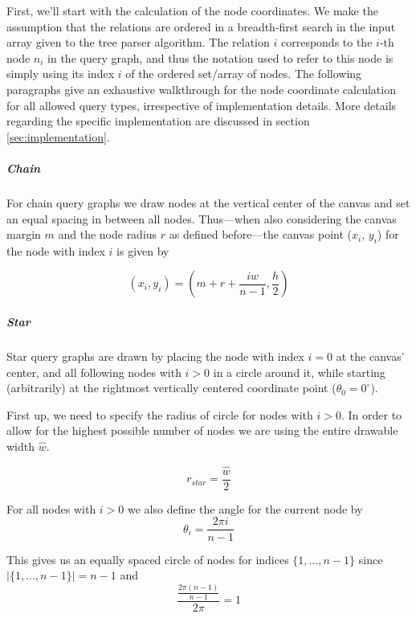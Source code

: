 First, we'll start with the calculation of the node coordinates. We make the assumption that the relations are ordered in a breadth-first search in the input array given to the tree parser algorithm. The relation $i$ corresponds to the $i$-th node $n_i$ in the query graph, and thus the notation used to refer to this node is simply using its index $i$ of the ordered set/array of nodes. The following paragraphs give an exhaustive walkthrough for the node coordinate calculation for all allowed query types, irrespective of implementation details. More details regarding the specific implementation are discussed in section \ref{sec:implementation}.

\subparagraph{Chain} 
For chain query graphs we draw nodes at the vertical center of the canvas and set an equal spacing in between all nodes. Thus—when also considering the canvas margin $m$ and the node radius $r$ as defined before—the canvas point ($x_i$, $y_i$) for the node with index $i$ is given by

\begin{equation}
    (x_i, y_i) = (m + r + \frac{i\hat{w}}{n - 1}, \frac{h}{2})
\end{equation}

\subparagraph{Star} 
Star query graphs are drawn by placing the node with index $i = 0$ at the canvas' center, and all following nodes with $i > 0$ in a circle around it, while starting (arbitrarily) at the rightmost vertically centered coordinate point ($\theta_0 = 0^{\circ}$).

First up, we need to specify the radius of circle for nodes with $i > 0$. In order to allow for the highest possible number of nodes we are using the entire drawable width $\hat{w}$.

\begin{equation}\label{eqn:painting-r_star}
    r_{star} = \frac{\hat{w}}{2}
\end{equation}

For all nodes with $i > 0$ we also define the angle for the current node by
\begin{equation}\label{eqn:painting-theta}
    \theta_i = \frac{2\pi i}{n - 1}
\end{equation}

This gives us an equally spaced circle of nodes for indices $\{1,\dots,n-1\}$ since $\vert\{1,...,n-1\}\vert = n-1$ and
\begin{equation}
    \frac{\frac{2\pi(n-1)}{n-1}}{2\pi} = 1   
\end{equation}

